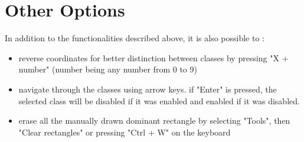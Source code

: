 \documentclass[12pt]{article}
\begin{document}
	\section{Other Options}
		In addition to the functionalities described above, it is also possible to :
		\begin{itemize}
			\item reverse coordinates for better distinction between classes by pressing "X + number" (number being any number from 0 to 9)
			\item navigate through the classes using arrow keys. if "Enter" is pressed, the selected class will be disabled if it was enabled and enabled if it was disabled.
			\item erase all the manually drawn dominant rectangle by selecting "Tools", then "Clear rectangles" or pressing "Ctrl + W" on the keyboard
		\end{itemize}
		
	
\end{document}
